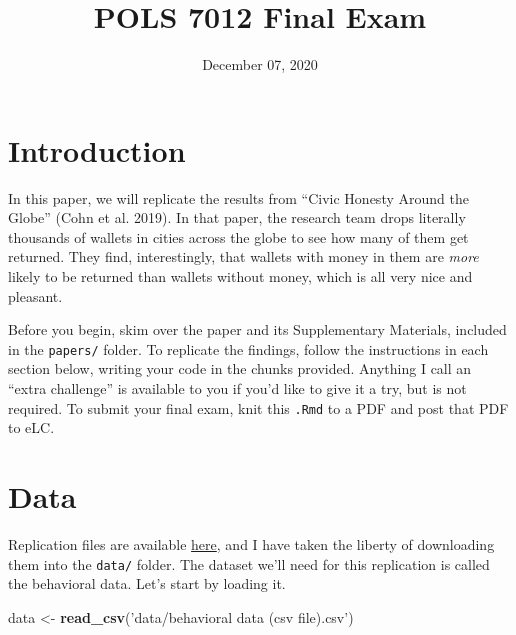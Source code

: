 \documentclass[12pt,halfline,a4paper,]{ouparticle}
\newenvironment{Shaded}{\begin{snugshade}}{\end{snugshade}}
\newcommand{\KeywordTok}[1]{\textcolor[rgb]{0.13,0.29,0.53}{\textbf{#1}}}
\newcommand{\NormalTok}[1]{#1}
\newcommand{\StringTok}[1]{\textcolor[rgb]{0.31,0.60,0.02}{#1}}
\begin{document}
\title{POLS 7012 Final Exam}

\author{%
\address{University of Georgia}
\and
{}\address{University of Georgia}
}

\abstract{}

\date{December 07, 2020}

\keywords{}

\maketitle



\hypertarget{introduction}{%
\section{Introduction}\label{introduction}}

In this paper, we will replicate the results from ``Civic Honesty Around
the Globe'' (Cohn et al. 2019). In that paper, the research team drops
literally thousands of wallets in cities across the globe to see how
many of them get returned. They find, interestingly, that wallets with
money in them are \emph{more} likely to be returned than wallets without
money, which is all very nice and pleasant.

Before you begin, skim over the paper and its Supplementary Materials,
included in the \texttt{papers/} folder. To replicate the findings,
follow the instructions in each section below, writing your code in the
chunks provided. Anything I call an ``extra challenge'' is available to
you if you'd like to give it a try, but is not required. To submit your
final exam, knit this \texttt{.Rmd} to a PDF and post that PDF to eLC.

\hypertarget{data}{%
\section{Data}\label{data}}

Replication files are available
\href{https://dataverse.harvard.edu/dataverse/honesty}{here}, and I have
taken the liberty of downloading them into the \texttt{data/} folder.
The dataset we'll need for this replication is called the behavioral
data. Let's start by loading it.

\begin{Shaded}
\begin{Highlighting}[]
\NormalTok{data <-}\StringTok{ }\KeywordTok{read_csv}\NormalTok{(}\StringTok{'data/behavioral data (csv file).csv'}\NormalTok{)}
\end{Highlighting}
\end{Shaded}
\end{document}
